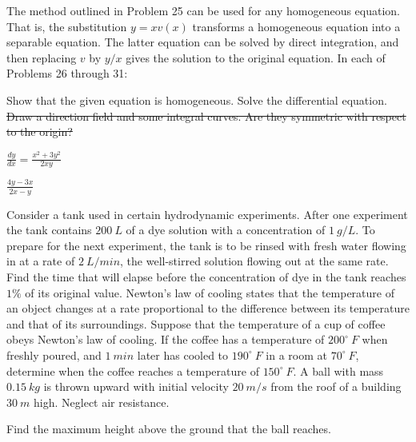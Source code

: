 \documentclass{lapchomework}
\begin{document}
\begin{instructions}
The method outlined in Problem 25 can be used for any homogeneous equation.
That is, the substitution $y = xv(x)$ transforms a homogeneous equation into a 
separable equation. The latter equation can be solved by direct integration, 
and then replacing $v$ by $y/x$ gives the solution to the original equation. In 
each of Problems 26 through 31:

\begin{subinstructions}
\subinstruction Show that the given equation is homogeneous.
\subinstruction Solve the differential equation.
\subinstruction \sout{Draw a direction field and some integral curves. Are they 
symmetric with respect to the origin?}
\end{subinstructions}

\end{instructions}

\begin{problems}

\problem [27] $\frac{dy}{dx}=\frac{x^2+3y^2}{2xy}$

\begin{solution}

\step 

\end{solution}

\problem [28] $\frac{4y-3x}{2x-y}$
\end{problems}


\begin{problems}
\problem [1] Consider a tank used in certain hydrodynamic experiments.
After one experiment the tank contains $200\:L$ of a dye solution with
a concentration of $1\:g/L$. To prepare for the next experiment, the tank
is to be rinsed with fresh water flowing in at a rate of $2\:L/min$, the
well-stirred solution flowing out at the same rate. Find the time that
will elapse before the concentration of dye in the tank reaches $1\%$ of
its original value.
\problem [12] Newton’s law of cooling states that the temperature of an object
changes at a rate proportional to the difference between its temperature
and that of its surroundings. Suppose that the temperature of a cup of
coffee obeys Newton’s law of cooling. If the coffee has a temperature
of $200^\circ\:F$ when freshly poured, and $1\:min$ later has cooled to 
$190^\circ\:F$ in a room at $70^\circ\:F$, determine when the coffee reaches a 
temperature of $150^\circ\:F$.
\problem [16] A ball with mass $0.15\:kg$ is thrown upward with initial
velocity $20\:m/s$ from the roof of a building $30\:m$ high. Neglect air
resistance.

\begin{subproblems}
\subproblem Find the maximum height above the ground that the ball
reaches.
\end{subproblems}

\end{problems}
\end{document}
